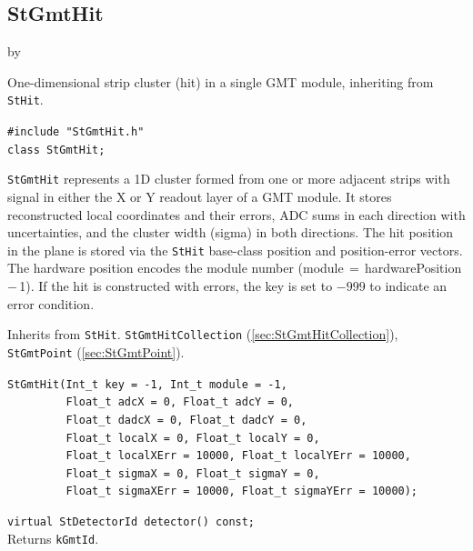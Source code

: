 \documentclass[twoside]{article}
\newcommand{\entrylabel}[1]{\mbox{\textbf{{#1}}}\hfil}%
\newenvironment{entry}
{\begin{list}{}%
    {\renewcommand{\makelabel}{\entrylabel}%
     \setlength{\labelwidth}{90pt}%
     \setlength{\leftmargin}{\labelwidth}
     \advance\leftmargin by \labelsep%
      }%
    }%
  {\end{list}}
\newcommand{\Entrylabel}[1]%
{\raisebox{0pt}[1ex][0pt]{\makebox[\labelwidth][l]%
    {\parbox[t]{\labelwidth}{\hspace{0pt}\textbf{{#1}}}}}}
\newenvironment{Entry}%
{\renewcommand{\entrylabel}{\Entrylabel}\begin{entry}}%
  {\end{entry}}
\begin{document}
\subsection{StGmtHit}
\label{sec:StGmtHit}
\begin{Entry}
\item[Summary] One-dimensional strip cluster (hit) in a single GMT module,
    inheriting from \texttt{StHit}.
\item[Synopsis]
    \verb+#include "StGmtHit.h"+\\
    \verb+class StGmtHit;+\\
\item[Description]
    \texttt{StGmtHit} represents a 1D cluster formed from one or more adjacent
    strips with signal in either the X or Y readout layer of a GMT module.
    It stores reconstructed local coordinates and their errors, ADC sums in
    each direction with uncertainties, and the cluster width (sigma) in both
    directions.  The hit position in the plane is stored via the
    \texttt{StHit} base-class position and position-error vectors.
    The hardware position encodes the module number (module\,$=$\,hardware\-Position\,$-$\,1).
    If the hit is constructed with errors, the key is set to $-999$ to indicate
    an error condition.
\item[Related Classes]
    Inherits from \texttt{StHit}.
    \texttt{StGmtHitCollection} (\ref{sec:StGmtHitCollection}),
    \texttt{StGmtPoint} (\ref{sec:StGmtPoint}).
\item[Public\\ Constructors]
    \verb+StGmtHit(Int_t key = -1, Int_t module = -1,+\\
    \verb+         Float_t adcX = 0, Float_t adcY = 0,+\\
    \verb+         Float_t dadcX = 0, Float_t dadcY = 0,+\\
    \verb+         Float_t localX = 0, Float_t localY = 0,+\\
    \verb+         Float_t localXErr = 10000, Float_t localYErr = 10000,+\\
    \verb+         Float_t sigmaX = 0, Float_t sigmaY = 0,+\\
    \verb+         Float_t sigmaXErr = 10000, Float_t sigmaYErr = 10000);+\\
\item[Public Member\\ Functions]
    \verb+virtual StDetectorId detector() const;+\\
    Returns \texttt{kGmtId}.\\

\end{Entry}
\end{document}
